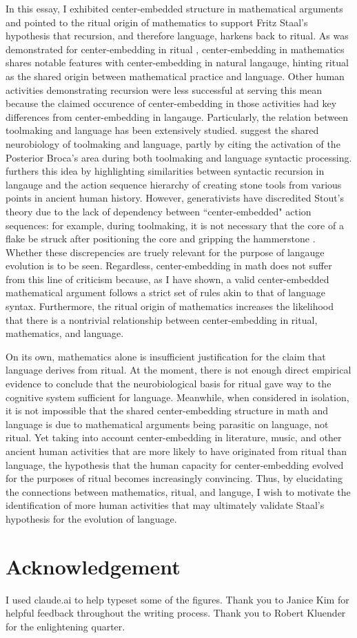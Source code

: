 \documentclass[12pt, letterpaper]{article}
\begin{document}
\vspace{1.5em}
In this essay, I exhibited center-embedded structure in mathematical arguments and pointed to the ritual origin of mathematics to support Fritz Staal's hypothesis that recursion, and therefore language, harkens back to ritual. 
As was demonstrated for center-embedding in ritual \parencite{staal1984ritual}, center-embedding in mathematics shares notable features with center-embedding in natural langauge, hinting ritual as the shared origin between mathematical practice and language. 
Other human activities demonstrating recursion were less successful at serving this mean because the claimed occurence of center-embedding in those activities had key differences from center-embedding in langauge. 
Particularly, the relation between toolmaking and language has been extensively studied. 
\cite{stout2009making} suggest the shared neurobiology of toolmaking and language, partly by citing the activation of the Posterior Broca's area during both toolmaking and language syntactic processing.  
\cite{stout2011stone} furthers this idea by highlighting similarities between syntactic recursion in langauge and the action sequence hierarchy of creating stone tools from various points in ancient human history.  
However, generativists have discredited Stout's theory due to the lack of dependency between ``center-embedded" action sequences: 
for example, during toolmaking, it is not necessary that the core of a flake be struck after positioning the core and gripping the hammerstone \parencite{berwick2017why, moro2014response}.  
Whether these discrepencies are truely relevant for the purpose of langauge evolution is to be seen. 
Regardless, center-embedding in math does not suffer from this line of criticism because, as I have shown, a valid center-embedded mathematical argument follows a strict set of rules akin to that of language syntax. 
Furthermore, the ritual origin of mathematics increases the likelihood that there is a nontrivial relationship between center-embedding in ritual, mathematics, and language. 

On its own, mathematics alone is insufficient justification for the claim that language derives from ritual. 
At the moment, there is not enough direct empirical evidence to conclude that the neurobiological basis for ritual gave way to the cognitive system sufficient for language. 
Meanwhile, when considered in isolation, it is not impossible that the shared center-embedding structure in math and language is due to mathematical arguments being parasitic on language, not ritual. 
Yet taking into account center-embedding in literature, music, and other ancient human activities that are more likely to have originated from ritual than language, the hypothesis that the human capacity for center-embedding evolved for the purposes of ritual becomes increasingly convincing. 
Thus, by elucidating the connections between mathematics, ritual, and languge, I wish to motivate the identification of more human activities that may ultimately validate Staal's hypothesis for the evolution of language. 


\newpage
\section*{Acknowledgement}
I used claude.ai to help typeset some of the figures. 
Thank you to Janice Kim for helpful feedback throughout the writing process. 
Thank you to Robert Kluender for the enlightening quarter. 

\printbibliography
\end{document}
